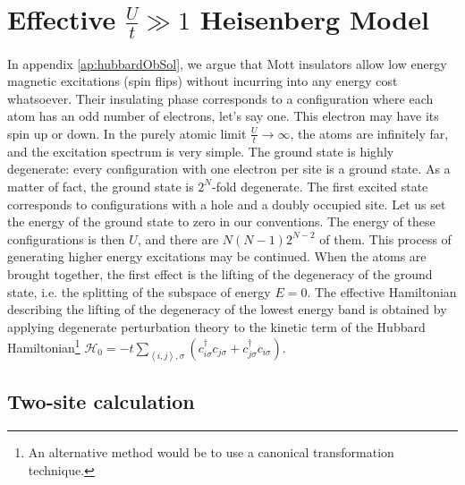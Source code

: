 \section{Effective $\frac{U}{t} \gg 1$ Heisenberg Model}\label{sec:effectiveHeisenberg}

In appendix \ref{ap:hubbardObSol}, we argue that Mott insulators allow low energy magnetic excitations (spin flips) without incurring into any energy cost whatsoever.
Their insulating phase corresponds to a configuration where each atom has an odd number of electrons, let's say one.
This electron may have its spin up or down.
In the purely atomic limit $\frac{U}{t} \rightarrow \infty$, the atoms are infinitely far, and the excitation spectrum is very simple.
The ground state is highly degenerate: every configuration with one electron per site is a ground state.
As a matter of fact, the ground state is $2^N$-fold degenerate.
The first excited state corresponds to configurations with a hole and a doubly occupied site.
Let us set the energy of the ground state to zero in our conventions.
The energy of these configurations is then $U$, and there are $N(N-1)2^{N-2}$ of them.
This process of generating higher energy excitations may be continued.
When the atoms are brought together, the first effect is the lifting of the degeneracy of the ground state, i.e. the splitting of the subspace of energy $E = 0$.
The effective Hamiltonian describing the lifting of the degeneracy of the lowest energy band is obtained by applying degenerate perturbation theory \cite{mila_physique_2007} to the kinetic term of the Hubbard Hamiltonian\footnote{An alternative method would be to use a canonical transformation technique.}
$
\mathcal{H}_0 = - t \sum_{\left\langle i, j \right\rangle, \sigma} ( c_{i\sigma}^\dagger c_{j\sigma} + c_{j\sigma}^\dagger c_{i\sigma} ) 
$.

\subsection{Two-site calculation}

